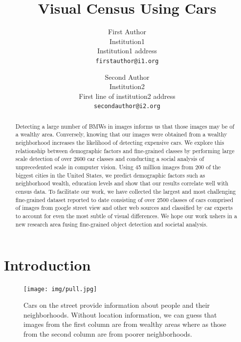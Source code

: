 \documentclass[10pt,twocolumn,letterpaper]{article}
\begin{document}
\title{Visual Census Using Cars}

\author{First Author\\
Institution1\\
Institution1 address\\
{\tt\small firstauthor@i1.org}
\and
Second Author\\
Institution2\\
First line of institution2 address\\
{\tt\small secondauthor@i2.org}
}

\maketitle

\begin{abstract}
Detecting a large number of BMWs in images informs us that those images may be of a wealthy area. Conversely, knowing that our images were obtained from a wealthy neighborhood increases the likelihood of detecting expensive cars. We explore this relationship between demographic factors and fine-grained classes by performing large scale detection of over 2600 car classes and conducting a social analysis of unprecedented scale in computer vision. Using 45 million images from 200 of the biggest cities in the United States, we predict demographic factors such as neighborhood wealth, education levels and show that our results correlate well with census data. To facilitate our work, we have collected the largest and most challenging fine-grained dataset reported to date consisting of over 2500 classes of cars comprised of images from google street view and other web sources and classified by car experts to account for even the most subtle of visual differences. We hope our work ushers in a new research area fusing fine-grained object detection and societal analysis.
\end{abstract}

\section{Introduction}
\begin{figure}[t]
\begin{center}
   \texttt{[image: img/pull.jpg]}
\end{center}
   \caption{Cars on the street provide information about people and their neighborhoods. Without location information, we can guess that images from the first column are from wealthy areas where as those from the second column are from poorer neighborhoods.}
\label{fig:pull}
\end{figure}
\end{document}
